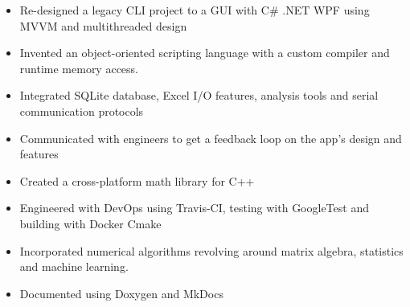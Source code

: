 \documentclass[11pt,a4paper,ragged2e]{altacv}
\begin{document}
\begin{paracol}{1}
 \\
\vspace{0.5mm}
 \\ 
\vspace{-0.15\baselineskip}
\tightdivider \\
 \smallskip \\
\tightdivider \\




{}

\begin{itemize}
\item Re-designed a legacy CLI project to a GUI with C\# .NET WPF using MVVM and multithreaded design
\item Invented an object-oriented scripting language with a custom compiler and runtime memory access.
\item Integrated SQLite database, Excel I/O features, analysis tools and serial communication protocols 
\item Communicated with engineers to get a feedback loop on the app's design and features
\end{itemize}

\tightdivider
{}
\begin{itemize}
\item Created a cross-platform math library for C++ 
\item Engineered with DevOps using Travis-CI, testing with GoogleTest and building with Docker Cmake
\item Incorporated numerical algorithms revolving around matrix algebra, statistics and machine learning.
\item Documented using Doxygen and MkDocs
\end{itemize}
\tightdivider



\end{paracol}
\end{document}
